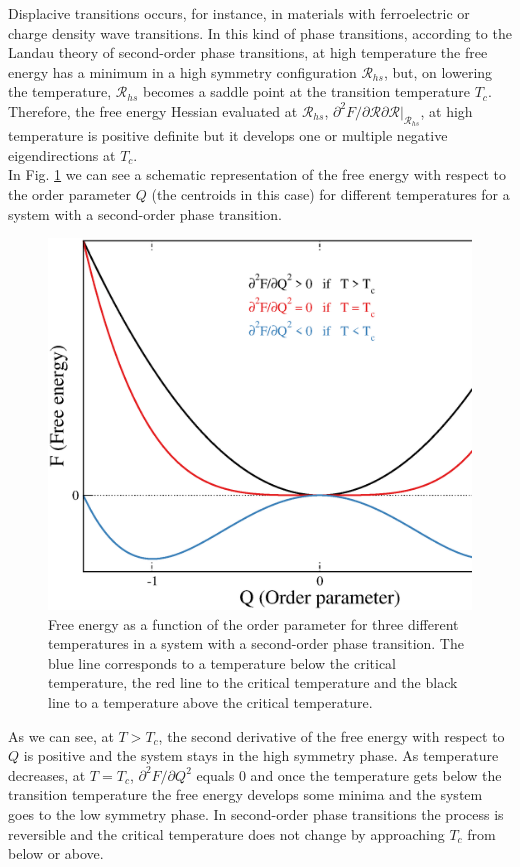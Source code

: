 Displacive transitions occurs, for instance, in materials with ferroelectric or charge density wave transitions. In this kind of phase transitions, according to the Landau theory of second-order phase 
transitions\cite{lifshitz1980landau}, at high temperature the free energy has a minimum in a high symmetry configuration $\boldsymbol{\mathcal{R}}_{hs}$, but, on lowering the temperature, $\boldsymbol{\mathcal{R}}_{hs}$ 
becomes a saddle point at the transition temperature $T_{c}$. Therefore, the free energy Hessian evaluated at $\boldsymbol{\mathcal{R}}_{hs}$, $\partial^{2}F/\partial\boldsymbol{\mathcal{R\partial\boldsymbol{\mathcal{
R}}}}|_{\boldsymbol{\mathcal{R}}_{hs}}$, at high temperature is positive definite but it develops one or multiple negative eigendirections at $T_{c}$. \\

In Fig. \ref{transition} we can see a schematic representation of the free energy with respect to the order parameter $Q$ (the centroids in this case) for different temperatures for a system with a second-order phase transition.
\begin{figure}[h]
\begin{center}
\includegraphics[width=0.8\linewidth]{Figures/data.eps}
\caption{Free energy as a function of the order parameter for three different temperatures in a system with a second-order phase transition. The blue line corresponds to a temperature below the critical temperature, the red 
line to the critical temperature and the black line to a temperature above the critical temperature.}
\label{transition}
\end{center}
\end{figure}
As we can see, at $T>T_{c}$, the second derivative of the free energy with respect to $Q$ is positive and the system stays in the high symmetry phase. As temperature decreases, at $T=T_{c}$, $\partial^{2}F/\partial Q^{2}$ equals 
$0$ and once the temperature gets below the transition temperature the free energy develops some minima and the system goes to the low symmetry phase. In second-order phase transitions the process is reversible and the critical 
temperature does not change by approaching $T_{c}$ from below or above. \\

